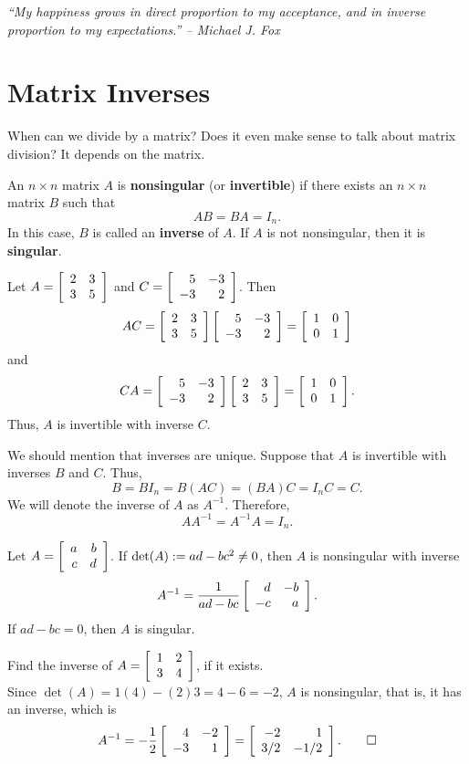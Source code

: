 \begin{center} 
\emph{``My happiness grows in direct proportion to my acceptance, and in inverse proportion to my expectations.'' -- Michael J. Fox}
\end{center}

\section{Matrix Inverses}\label{sec:nonsingular}
When can we divide by a matrix? Does it even make sense to talk about matrix division? It depends on the matrix.\\

\begin{Def} An $n\times n$ matrix $A$ is  \textbf{nonsingular} (or \textbf{invertible}) if there exists an $n\times n$ matrix $B$ such that 
\[AB = BA = I_n.\] In this case, $B$ is called an \textbf{inverse} of $A$. If $A$ is not nonsingular, then it is \textbf{singular}.
\end{Def}\vs

\begin{Exam} Let $A = \mtx{rr}{2&3\\3&5}$ and $C = \mtx{rr}{5&-3\\-3&2}$. Then 
\[AC = \mtx{rr}{2&3\\3&5}\mtx{rr}{5&-3\\-3&2} = \mtx{rr}{1&0\\0&1}\] and \[CA = \mtx{rr}{5&-3\\-3&2}\mtx{rr}{2&3\\3&5} = \mtx{rr}{1&0\\0&1}.\]
Thus, $A$ is invertible with inverse $C$.
\end{Exam}\vs

We should mention that inverses are unique. Suppose that $A$ is invertible with inverses $B$ and $C$. Thus, 
\[B = BI_n = B(AC) = (BA)C = I_nC = C.\] We will denote the inverse of $A$ as $A^{-1}$. Therefore, 
\[AA^{-1} = A^{-1}A = I_n.\]\vs

\begin{Thm}\label{thm:inverseDet} Let $A = \mtx{rr}{a&b\\c&d}$. If $\det(A) := ad-bc\footnotemark[2]\neq 0$, then $A$ is nonsingular with inverse 
\[A^{-1} = \dfrac{1}{ad-bc}\mtx{rr}{d&-b\\-c&a}.\] If $ad-bc=0$, then $A$ is singular.
\end{Thm}


\begin{Exam} Find the inverse of $A = \mtx{rr}{1&2\\3&4}$, if it exists.\\

Since $\det(A) = 1(4)-(2)3 = 4-6 = -2$, $A$ is nonsingular, that is, it has an inverse, which is
\[A^{-1} = -\dfrac{1}{2}\mtx{rr}{4 &-2\\ -3 & 1} = \mtx{rr}{-2 & 1 \\ 3/2 & -1/2}. \qedhere\] 
\end{Exam}\vs

